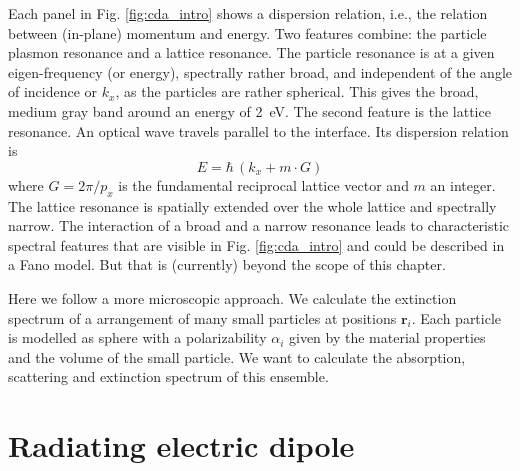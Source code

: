 Each panel in Fig. \ref{fig:cda_intro} shows a dispersion relation, i.e., the relation between (in-plane) momentum and energy. Two features combine: the particle plasmon resonance and a lattice resonance. The particle resonance is at a given eigen-frequency (or energy), spectrally rather broad, and independent of the angle of incidence or $k_x$, as the particles are rather spherical. This gives the broad, medium gray band around an energy of 2~eV. The second feature is the lattice resonance.  An optical wave travels parallel to the interface. Its dispersion relation is
\begin{equation}
 E =   \hbar  \, \left(  k_x + m \cdot G \right)
\end{equation}
where $G = 2 \pi / p_x$ is the fundamental reciprocal lattice vector and $m$ an integer. The lattice resonance is spatially extended over the whole lattice and spectrally narrow. The interaction of a broad and a narrow resonance leads to characteristic spectral features that are visible in Fig. \ref{fig:cda_intro}  and could be described in a Fano model. But that is (currently) beyond the scope of this chapter.

Here we follow a more microscopic approach. We calculate the extinction spectrum of a  arrangement of  many small particles at positions $\mathbf{r}_i$.
Each  particle is modelled as sphere  with a  polarizability $\alpha_i$ given by the material properties and the volume of the small particle. We want to calculate the absorption, scattering and extinction spectrum of this  ensemble.


\section{Radiating electric dipole}

